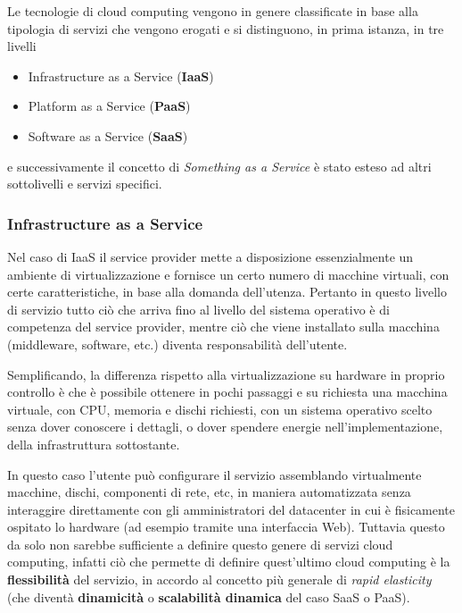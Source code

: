 \documentclass[italian,]{article}
\providecommand{\tightlist}{%
  \setlength{\itemsep}{0pt}\setlength{\parskip}{0pt}}
\begin{document}
Le tecnologie di cloud computing vengono in genere classificate in base
alla tipologia di servizi che vengono erogati e si distinguono, in prima
istanza, in tre livelli

\begin{itemize}
\tightlist
\item
  Infrastructure as a Service (\textbf{IaaS})
\item
  Platform as a Service (\textbf{PaaS})
\item
  Software as a Service (\textbf{SaaS})
\end{itemize}

e successivamente il concetto di \emph{Something as a Service} è stato
esteso ad altri sottolivelli e servizi specifici.

\subsubsection{Infrastructure as a
Service}\label{infrastructure-as-a-service}

Nel caso di IaaS il service provider mette a disposizione essenzialmente
un ambiente di virtualizzazione e fornisce un certo numero di macchine
virtuali, con certe caratteristiche, in base alla domanda dell'utenza.
Pertanto in questo livello di servizio tutto ciò che arriva fino al
livello del sistema operativo è di competenza del service provider,
mentre ciò che viene installato sulla macchina (middleware, software,
etc.) diventa responsabilità dell'utente.

Semplificando, la differenza rispetto alla virtualizzazione su hardware
in proprio controllo è che è possibile ottenere in pochi passaggi e su
richiesta una macchina virtuale, con CPU, memoria e dischi richiesti,
con un sistema operativo scelto senza dover conoscere i dettagli, o
dover spendere energie nell'implementazione, della infrastruttura
sottostante.

In questo caso l'utente può configurare il servizio assemblando
virtualmente macchine, dischi, componenti di rete, etc, in maniera
automatizzata senza interaggire direttamente con gli amministratori del
datacenter in cui è fisicamente ospitato lo hardware (ad esempio tramite
una interfaccia Web). Tuttavia questo da solo non sarebbe sufficiente a
definire questo genere di servizi cloud computing, infatti ciò che
permette di definire quest'ultimo cloud computing è la
\textbf{flessibilità} del servizio, in accordo al concetto più generale
di \emph{rapid elasticity} (che diventà \textbf{dinamicità} o
\textbf{scalabilità dinamica} del caso SaaS o PaaS).
\end{document}

